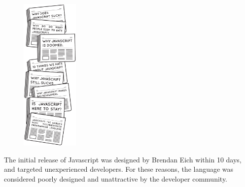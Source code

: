 
\begin{figure}
  \vspace{-57pt}
  \begin{center}
    \includegraphics[width=0.25\textwidth]{../resources/javascript-hate.pdf}
  \end{center}
  \vspace{-35pt}
\end{figure}

The initial release of Javascript was designed by Brendan Eich within 10 days, and targeted unexperienced developers.
For these reasons, the language was considered poorly designed and unattractive by the developer community.



